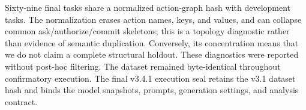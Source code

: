 Sixty-nine final tasks share a normalized action-graph hash with development
tasks. The normalization erases action names, keys, and values, and can collapse
common ask/authorize/commit skeletons; this is a topology diagnostic rather than
evidence of semantic duplication. Conversely, its concentration means that we
do not claim a complete structural holdout. These diagnostics were reported
without post-hoc filtering. The dataset remained byte-identical throughout
confirmatory execution. The final v3.4.1 execution seal retains the v3.1 dataset
hash and binds the model snapshots, prompts, generation settings, and analysis
contract.
